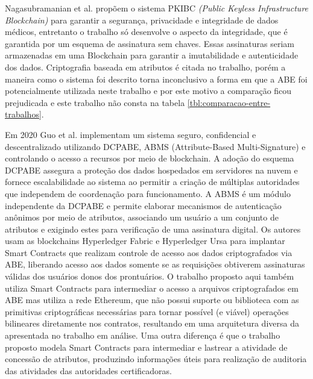 \documentclass[a4paper,11pt]{article}
\begin{document}
Nagasubramanian et al. \cite{Nagasubramanian2020} propõem o sistema PKIBC \emph{(Public Keyless Infrastructure Blockchain)} para garantir a segurança, privacidade e integridade de dados médicos, entretanto o trabalho só desenvolve o aspecto da integridade, que é garantida por um esquema de assinatura sem chaves.
Essas assinaturas seriam armazenadas em uma Blockchain para garantir a imutabilidade e autenticidade dos dados.
Criptografia baseada em atributos é citada no trabalho, porém a maneira como o sistema foi descrito torna inconclusivo a forma em que a ABE foi potencialmente utilizada neste trabalho e por este motivo a comparação ficou prejudicada e este trabalho não consta na tabela \ref{tbl:comparacao-entre-trabalhos}.

Em 2020 Guo et al. \cite{Guo2020} implementam um sistema seguro, confidencial e descentralizado utilizando DCPABE, ABMS (Attribute-Based Multi-Signature) e controlando o acesso a recursos por meio de blockchain.
A adoção do esquema DCPABE assegura a proteção dos dados hospedados em servidores na nuvem e fornece escalabilidade ao sistema ao permitir a criação de múltiplas autoridades que independem de coordenação para funcionamento.
A ABMS é um módulo independente da DCPABE e permite elaborar mecanismos de autenticação anônimos por meio de atributos, associando um usuário a um conjunto de atributos e exigindo estes para verificação de uma assinatura digital.
Os autores usam as blockchains Hyperledger Fabric e Hyperledger Ursa para implantar Smart Contracts que realizam controle de acesso aos dados criptografados via ABE, liberando acesso aos dados somente se as requisições obtiverem assinaturas válidas dos usuários donos dos prontuários.
O trabalho proposto aqui também utiliza Smart Contracts para intermediar o acesso a arquivos criptografados em ABE mas utiliza a rede Ethereum, que não possui suporte ou biblioteca com as primitivas criptográficas necessárias para tornar possível (e viável) operações bilineares diretamente nos contratos, resultando em uma arquitetura diversa da apresentada no trabalho em análise.
Uma outra diferença é que o trabalho proposto modela Smart Contracts para intermediar e lastrear a atividade de concessão de atributos, produzindo informações úteis para realização de auditoria das atividades das autoridades certificadoras.
\end{document}
